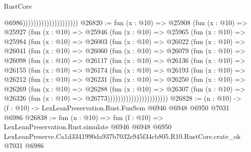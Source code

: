 \begin{lexlean}{RustCore}
\begin{coremodule}
                                              @6986)))))))))))))))))))))
@26820 := fun (x : @10) =>
  @25908
    (fun (x : @10) =>
    @25927
      (fun (x : @10) =>
      @25946
        (fun (x : @10) =>
        @25965
          (fun (x : @10) =>
          @25984
            (fun (x : @10) =>
            @26003
              (fun (x : @10) =>
              @26022
                (fun (x : @10) =>
                @26041
                  (fun (x : @10) =>
                  @26060
                    (fun (x : @10) =>
                    @26079
                      (fun (x : @10) =>
                      @26098
                        (fun (x : @10) =>
                        @26117
                          (fun (x : @10) =>
                          @26136
                            (fun (x : @10) =>
                            @26155
                              (fun (x : @10) =>
                              @26174
                                (fun (x : @10) =>
                                @26193
                                  (fun (x : @10) =>
                                  @26212
                                    (fun (x : @10) =>
                                    @26231
                                      (fun (x : @10) =>
                                      @26250
                                        (fun (x : @10) =>
                                        @26269
                                          (fun (x : @10) =>
                                          @26288
                                            (fun (x : @10) =>
                                            @26307
                                              (fun (x : @10) =>
                                              @26326 (fun (x : @10) => @26773)))))))))))))))))))))))
@26828 := (n : @10) -> (f : @10) -> LexLeanPreservation.Rust.FunSem @6946 @6948 @6950 @7031 @6986
@26838 := fun (n : @10) =>
  fun (f : @10) =>
  LexLeanPreservation.Rust.simulate
    @6946
    @6948
    @6950
    LexLeanPreserve.Ca1d3341990da937b7032e945f34cb805.R10.RustCore.crate_ok
    @7031
    @6986
\end{coremodule}
\end{lexlean}
